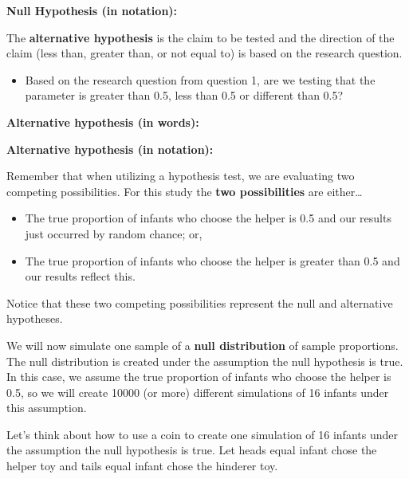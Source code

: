 \documentclass[
]{report}
\providecommand{\tightlist}{%
  \setlength{\itemsep}{0pt}\setlength{\parskip}{0pt}}
\begin{document}
\textbf{Null Hypothesis (in notation):}

\vspace{0.5in}

The \textbf{alternative hypothesis} is the claim to be tested and the direction of the claim (less than, greater than, or not equal to) is based on the research question.

\begin{itemize}
\tightlist
\item
  Based on the research question from question 1, are we testing that the parameter is greater than 0.5, less than 0.5 or different than 0.5?
\end{itemize}

\vspace{0.2in}

\textbf{Alternative hypothesis (in words):}

\vspace{0.5in}

\textbf{Alternative hypothesis (in notation):}

\vspace{0.5in}

Remember that when utilizing a hypothesis test, we are evaluating two competing possibilities. For this study the \textbf{two possibilities} are either\ldots{}

\begin{itemize}
\item
  The true proportion of infants who choose the helper is 0.5 and our results just occurred by random chance; or,
\item
  The true proportion of infants who choose the helper is greater than 0.5 and our results reflect this.
\end{itemize}

Notice that these two competing possibilities represent the null and alternative hypotheses.

We will now simulate one sample of a \textbf{null distribution} of sample proportions. The null distribution is created under the assumption the null hypothesis is true. In this case, we assume the true proportion of infants who choose the helper is 0.5, so we will create 10000 (or more) different simulations of 16 infants under this assumption.

Let's think about how to use a coin to create one simulation of 16 infants under the assumption the null hypothesis is true. Let heads equal infant chose the helper toy and tails equal infant chose the hinderer toy.
\end{document}
